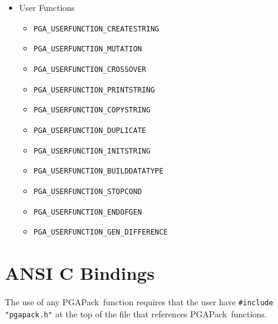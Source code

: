 \documentclass{report}
\newcommand{\pga}{PGAPack}
\begin{document}
\begin{itemize}
\item User Functions
\begin{itemize}
\item \verb+PGA_USERFUNCTION_CREATESTRING+
\item \verb+PGA_USERFUNCTION_MUTATION+
\item \verb+PGA_USERFUNCTION_CROSSOVER+
\item \verb+PGA_USERFUNCTION_PRINTSTRING+
\item \verb+PGA_USERFUNCTION_COPYSTRING+
\item \verb+PGA_USERFUNCTION_DUPLICATE+
\item \verb+PGA_USERFUNCTION_INITSTRING+
\item \verb+PGA_USERFUNCTION_BUILDDATATYPE+
\item \verb+PGA_USERFUNCTION_STOPCOND+
\item \verb+PGA_USERFUNCTION_ENDOFGEN+
\item \verb+PGA_USERFUNCTION_GEN_DIFFERENCE+
\end{itemize}

\end{itemize}

\section*{ANSI C Bindings}\label{app:bindings-c}

The use of any \pga\ function requires that the user have {\tt \#include
"pgapack.h"} at the top of the file that references \pga\ functions.
\vspace{.5in}
\end{document}
